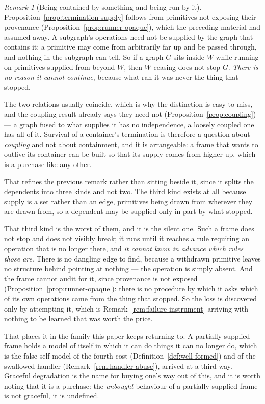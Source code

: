 \documentclass[11pt,a4paper]{article}
\theoremstyle{remark}\newtheorem{remark}[definition]{Remark}
\begin{document}
\begin{remark}[Being contained by something and being run by it]\label{rem:supply-not-containment}
Proposition~\ref{prop:termination-supply} follows from primitives not exposing their provenance
(Proposition~\ref{prop:runner-opaque}), which the preceding material had assumed away. A subgraph's operations need not be supplied by the graph that
contains it: a primitive may come from arbitrarily far up and be passed through, and nothing in the
subgraph can tell. So if a graph $G$ sits inside $W$ while running on primitives supplied from beyond
$W$, then $W$ ceasing does not stop $G$. \emph{There is no reason it cannot continue}, because what ran
it was never the thing that stopped.

The two relations usually coincide, which is why the distinction is easy to miss, and the
coupling result already says they need not (Proposition~\ref{prop:coupling}) --- a graph fused to what
supplies it has no independence, a loosely coupled one has all of it. Survival of a container's
termination is therefore a question about \emph{coupling} and not about containment, and it is
arrangeable: a frame that wants to outlive its container can be built so that its supply comes from
higher up, which is a purchase like any other.

That refines the previous remark rather than sitting beside it, since it splits the dependents into
three kinds and not two. The third kind exists at all because supply is a set rather than an edge,
primitives being drawn from wherever they are drawn from, so a dependent may be supplied only in part
by what stopped.

That third kind is the worst of them, and it is the silent one. Such a frame
does not stop and does not visibly break; it runs until it reaches a rule requiring an operation that is
no longer there, and \emph{it cannot know in advance which rules those are}. There is no dangling edge
to find, because a withdrawn primitive leaves no structure behind pointing at nothing --- the operation
is simply absent. And the frame cannot audit for it, since provenance is not exposed
(Proposition~\ref{prop:runner-opaque}): there is no procedure by which it asks which of its own
operations came from the thing that stopped. So the loss is discovered only by attempting it, which is
Remark~\ref{rem:failure-instrument} arriving with nothing to be learned that was worth the price.

That places it in the family this paper keeps returning to. A partially supplied frame holds a model of
itself in which it can do things it can no longer do, which is the false self-model of the fourth cost
(Definition~\ref{def:well-formed}) and of the swallowed handler
(Remark~\ref{rem:handler-abuse}), arrived at a third way. Graceful degradation is the name for buying
one's way out of this, and it is worth noting that it is a purchase: the \emph{unbought} behaviour of a
partially supplied frame is not graceful, it is undefined.
\end{remark}
\end{document}
